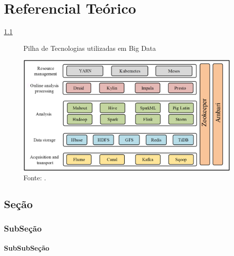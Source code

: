 \chapter{Referencial Teórico}
\lipsum[1] \ref{fig:Stack} \cite{anuradha2015brief}

\begin{figure}[!htb]
    \centering
    \begin{minipage}{0.8\textwidth}
        \caption{\label{fig:Stack} Pilha de Tecnologias utilizadas em Big Data}
        \includegraphics[width=\textwidth]{Imagens/Stack.png}
        \caption*{\footnotesize Fonte: \textcite{sun2023survey}.}
    \end{minipage}
\end{figure}

\lipsum[6]

\section{Seção}
\lipsum[2]
\cite{anuradha2015brief}
\subsection{SubSeção}
\lipsum[3]
\cite{anuradha2015brief}
\subsubsection{SubSubSeção}
\lipsum[4]
\cite{zaharia2012resilient}